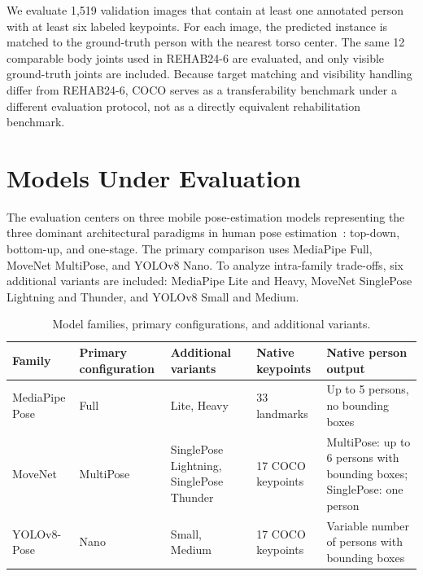 We evaluate 1{,}519 validation images that contain at least one annotated person with at least six labeled keypoints. For each image, the predicted instance is matched to the ground-truth person with the nearest torso center. The same 12 comparable body joints used in REHAB24-6 are evaluated, and only visible ground-truth joints are included. Because target matching and visibility handling differ from REHAB24-6, COCO serves as a transferability benchmark under a different evaluation protocol, not as a directly equivalent rehabilitation benchmark.

\section{Models Under Evaluation}
\label{sec:model-config}

The evaluation centers on three mobile pose-estimation models representing the three dominant architectural paradigms in human pose estimation~\cite{zheng2023deep}: top-down, bottom-up, and one-stage. The primary comparison uses MediaPipe Full, MoveNet MultiPose, and YOLOv8 Nano. To analyze intra-family trade-offs, six additional variants are included: MediaPipe Lite and Heavy, MoveNet SinglePose Lightning and Thunder, and YOLOv8 Small and Medium.

\begin{table}[htbp]
  \centering
  \caption{Model families, primary configurations, and additional variants.}
  \label{tab:models}
  \begin{tabular}{p{2.5cm}p{2.7cm}p{3.2cm}p{2.2cm}p{3.0cm}}
    \toprule
    Family & Primary configuration & Additional variants & Native keypoints & Native person output \\
    \midrule
    MediaPipe Pose & Full & Lite, Heavy & 33 landmarks & Up to 5 persons, no bounding boxes \\
    MoveNet & MultiPose & SinglePose Lightning, SinglePose Thunder & 17 COCO keypoints & MultiPose: up to 6 persons with bounding boxes; SinglePose: one person \\
    YOLOv8-Pose & Nano & Small, Medium & 17 COCO keypoints & Variable number of persons with bounding boxes \\
    \bottomrule
  \end{tabular}
\end{table}
\FloatBarrier

